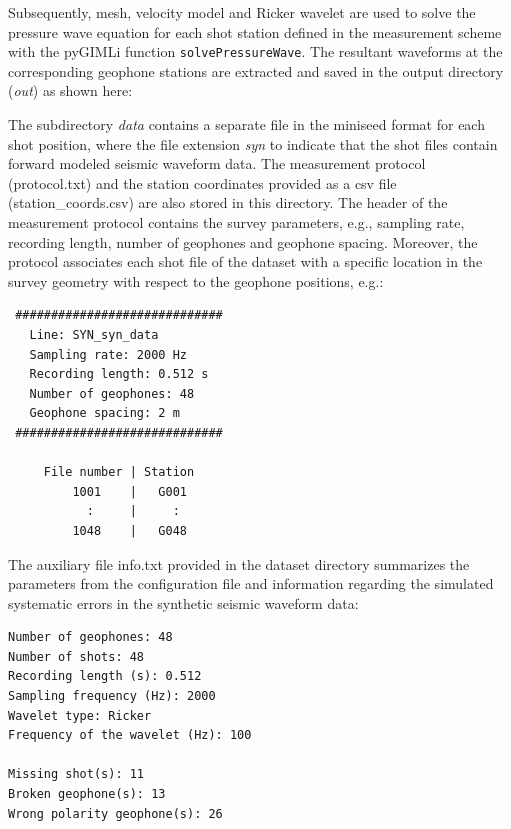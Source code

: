 \documentclass[a4paper,fleqn]{cas-sc}
\begin{document}
Subsequently, mesh, velocity model and Ricker wavelet are used to solve the pressure wave equation for each shot station defined in the measurement scheme with the pyGIMLi function \texttt{solvePressureWave}.
The resultant waveforms at the corresponding geophone stations are extracted and saved in the output directory (\textit{out}) as shown here:

The subdirectory \textit{data} contains a separate file in the miniseed format \citep{ahern2012, ringler2015} for each shot position, where the file extension \textit{syn} to indicate that the shot files contain forward modeled seismic waveform data. 
The measurement protocol (protocol.txt) and the station coordinates provided as a csv file (station\_coords.csv) are also stored in this directory. The header of the measurement protocol contains the survey parameters, e.g., sampling rate, recording length, number of geophones and geophone spacing. Moreover, the protocol associates each shot file of the dataset with a specific location in the survey geometry with respect to the geophone positions, e.g.:
\begin{footnotesize}
\begin{verbatim}
 #############################
   Line: SYN_syn_data             
   Sampling rate: 2000 Hz    
   Recording length: 0.512 s 
   Number of geophones: 48   
   Geophone spacing: 2 m     
 #############################
 
     File number | Station
         1001    |   G001
           :     |     :
         1048    |   G048
\end{verbatim}
\end{footnotesize}
The auxiliary file info.txt provided in the dataset directory summarizes the parameters from the configuration file and information regarding the simulated systematic errors in the synthetic seismic waveform data:
\begin{footnotesize}
\begin{verbatim}
Number of geophones: 48
Number of shots: 48
Recording length (s): 0.512
Sampling frequency (Hz): 2000
Wavelet type: Ricker
Frequency of the wavelet (Hz): 100

Missing shot(s): 11
Broken geophone(s): 13
Wrong polarity geophone(s): 26
\end{verbatim}
\end{footnotesize}
\end{document}
